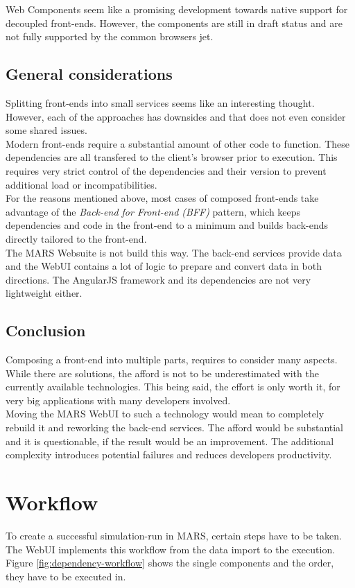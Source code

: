 Web Components seem like a promising development towards native support for decoupled front-ends. However, the components are still in draft status and are not fully supported by the common browsers jet.


\subsection{General considerations}
Splitting front-ends into small services seems like an interesting thought. However, each of the approaches has downsides and that does not even consider some shared issues.\\
Modern front-ends require a substantial amount of other code to function. These dependencies are all transfered to the client's browser prior to execution. This requires very strict control of the dependencies and their version to prevent additional load or incompatibilities.\\
For the reasons mentioned above, most cases of composed front-ends take advantage of the \textit{Back-end for Front-end (BFF)} pattern, which keeps dependencies and code in the front-end to a minimum and builds back-ends directly tailored to the front-end.\\
The MARS Websuite is not build this way. The back-end services provide data and the WebUI contains a lot of logic to prepare and convert data in both directions. The AngularJS framework and its dependencies are not very lightweight either.\\


\subsection{Conclusion}
Composing a front-end into multiple parts, requires to consider many aspects. While there are solutions, the afford is not to be underestimated with the currently available technologies. This being said, the effort is only worth it, for very big applications with many developers involved.\\
Moving the MARS WebUI to such a technology would mean to completely rebuild it and reworking the back-end services. The afford would be substantial and it is questionable, if the result would be an improvement. The additional complexity introduces potential failures and reduces developers productivity.



\section{Workflow}
To create a successful simulation-run in MARS, certain steps have to be taken. The WebUI implements this workflow from the data import to the execution. Figure \ref{fig:dependency-workflow} shows the single components and the order, they have to be executed in.

